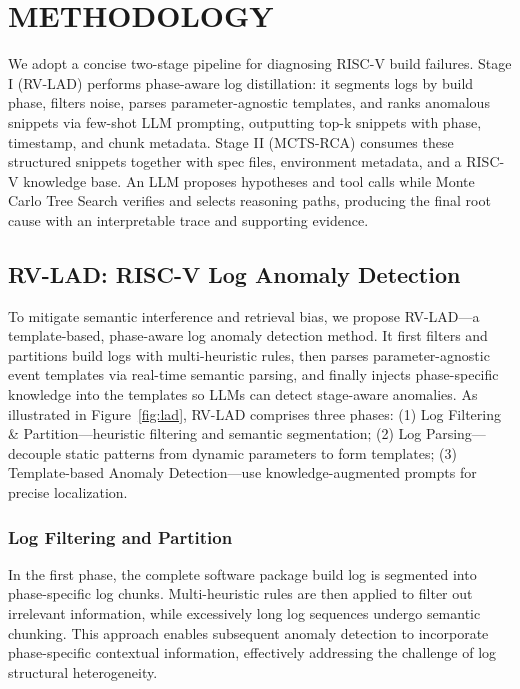 \documentclass[10pt,conference]{IEEEtran}
\begin{document}
\section{ METHODOLOGY}

We adopt a concise two-stage pipeline for diagnosing RISC-V build failures. Stage I (RV-LAD) performs phase-aware log distillation: it segments logs by build phase, filters noise, parses parameter-agnostic templates, and ranks anomalous snippets via few-shot LLM prompting, outputting top-k snippets with phase, timestamp, and chunk metadata. Stage II (MCTS-RCA) consumes these structured snippets together with spec files, environment metadata, and a RISC-V knowledge base. An LLM proposes hypotheses and tool calls while Monte Carlo Tree Search verifies and selects reasoning paths, producing the final root cause with an interpretable trace and supporting evidence. 

\subsection{RV-LAD: RISC-V Log Anomaly Detection}\label{sec:lad}
To mitigate semantic interference and retrieval bias, we propose RV-LAD---a template-based, phase-aware log anomaly detection method. It first filters and partitions build logs with multi-heuristic rules, then parses parameter-agnostic event templates via real-time semantic parsing, and finally injects phase-specific knowledge into the templates so LLMs can detect stage-aware anomalies. As illustrated in Figure~\ref{fig:lad}, RV-LAD comprises three phases: (1) Log Filtering \& Partition---heuristic filtering and semantic segmentation; (2) Log Parsing---decouple static patterns from dynamic parameters to form templates; (3) Template-based Anomaly Detection---use knowledge-augmented prompts for precise localization.


\subsubsection{Log Filtering and Partition}\label{ss:lad-filter}
In the first phase, the complete software package build log is segmented into phase-specific log chunks. Multi-heuristic rules are then applied to filter out irrelevant information, while excessively long log sequences undergo semantic chunking. This approach enables subsequent anomaly detection to incorporate phase-specific contextual information, effectively addressing the challenge of log structural heterogeneity.
\end{document}
